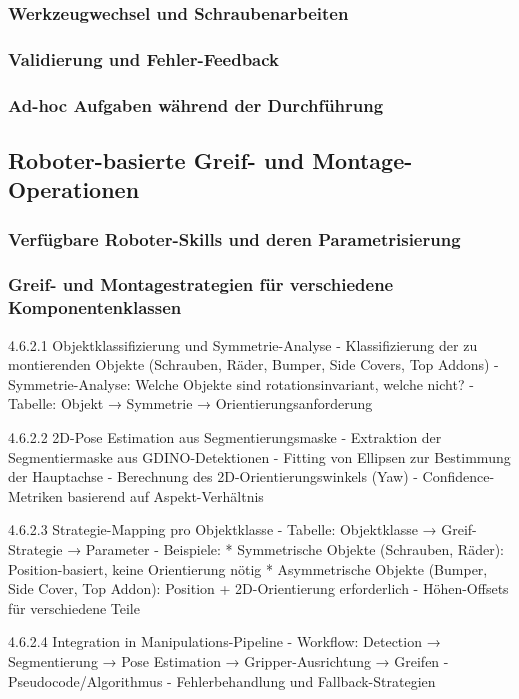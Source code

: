 \documentclass[12pt]{article}
\begin{document}
    \subsubsection{Werkzeugwechsel und Schraubenarbeiten}
    \subsubsection{Validierung und Fehler-Feedback}
    \subsubsection{Ad-hoc Aufgaben während der Durchführung}

\subsection{Roboter-basierte Greif- und Montage-Operationen}
    \subsubsection{Verfügbare Roboter-Skills und deren Parametrisierung}
    \subsubsection{Greif- und Montagestrategien für verschiedene Komponentenklassen}

 4.6.2.1 Objektklassifizierung und Symmetrie-Analyse
- Klassifizierung der zu montierenden Objekte (Schrauben, Räder, Bumper, Side Covers, Top Addons)
- Symmetrie-Analyse: Welche Objekte sind rotationsinvariant, welche nicht?
- Tabelle: Objekt → Symmetrie → Orientierungsanforderung

 4.6.2.2 2D-Pose Estimation aus Segmentierungsmaske
- Extraktion der Segmentiermaske aus GDINO-Detektionen
- Fitting von Ellipsen zur Bestimmung der Hauptachse
- Berechnung des 2D-Orientierungswinkels (Yaw)
- Confidence-Metriken basierend auf Aspekt-Verhältnis

 4.6.2.3 Strategie-Mapping pro Objektklasse
- Tabelle: Objektklasse → Greif-Strategie → Parameter
- Beispiele:
  * Symmetrische Objekte (Schrauben, Räder): Position-basiert, keine Orientierung nötig
  * Asymmetrische Objekte (Bumper, Side Cover, Top Addon): Position + 2D-Orientierung erforderlich
- Höhen-Offsets für verschiedene Teile

 4.6.2.4 Integration in Manipulations-Pipeline
- Workflow: Detection → Segmentierung → Pose Estimation → Gripper-Ausrichtung → Greifen
- Pseudocode/Algorithmus
- Fehlerbehandlung und Fallback-Strategien
\end{document}
